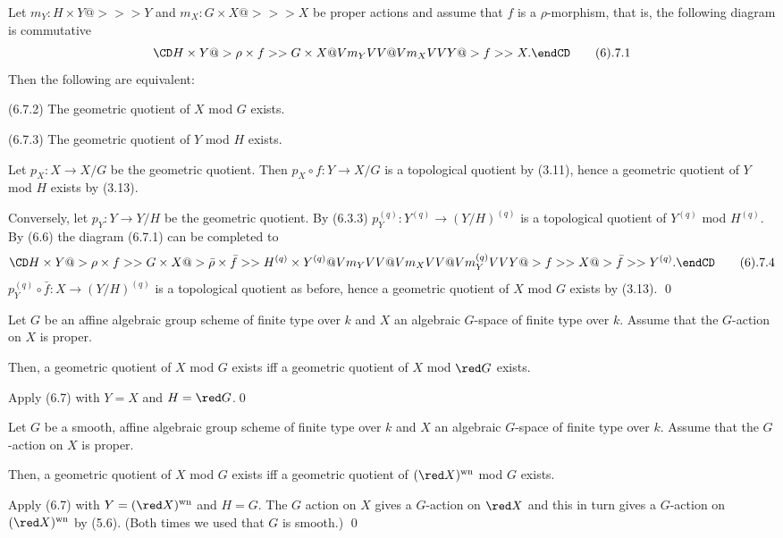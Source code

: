 Let $m_Y:H\times Y@>>> Y$ and $m_X:G\times X@>>> X$ be proper actions and
assume that $f$ is a $\rho$-morphism, that is, the following diagram is
commutative
$$
\CD
H\times Y@>{\rho\times f}>> G\times X\\
@Vm_YVV @Vm_XVV\\
Y@>f>> X.
\endCD\tag 6.7.1
$$
Then the following are equivalent:

(6.7.2) The geometric quotient of $X$ mod $G$ exists.

(6.7.3) The geometric quotient of $Y$ mod $H$ exists.
\endproclaim

\demop  Let
$p_X:X\to X/G$ be the geometric quotient. Then
$p_X\circ f:Y\to X/G$ is a topological quotient by (3.11), hence a
geometric quotient of $Y$ mod $H$ exists by (3.13).

Conversely,  let $p_Y:Y\to Y/H$ be the geometric quotient. By
(6.3.3)
$p_Y^{(q)}:Y^{(q)}\to (Y/H)^{(q)}$ is a topological quotient of $Y^{(q)}$ mod
$H^{(q)}$. By (6.6) the diagram (6.7.1) can be completed to
$$
\CD
H\times Y@>{\rho\times f}>> G\times X
@>{\bar{\rho}\times \bar f}>> H^{(q)}\times Y^{(q)}\\
@Vm_YVV @Vm_XVV @Vm_Y^{(q)}VV \\
Y@>f>> X@>\bar f>> Y^{(q)}.
\endCD\tag 6.7.4
$$
$p_Y^{(q)}\circ \bar f:X\to (Y/H)^{(q)}$ is a topological quotient as before,
hence a  geometric quotient of $X$ mod $G$ exists by (3.13). \qed
\enddemo


  Let $G$ be an affine algebraic group scheme of
finite type over $k$ and $X$ an algebraic $G$-space of finite type
over $k$. Assume that the $G$-action on $X$ is proper.

Then, a geometric quotient of $X$ mod $G$ exists iff
a geometric quotient of $X$ mod $\red G$ exists.
\endproclaim

\demop Apply (6.7) with $Y=X$ and $H=\red G$.\qed\enddemo








  Let $G$ be a smooth, affine  algebraic group
scheme of finite type over $k$ and $X$ an algebraic $G$-space of finite type
over $k$. Assume that the $G$-action on $X$ is proper.

Then, a geometric quotient of $X$ mod $G$ exists iff
a geometric quotient of $(\red X)^{\text{wn}}$ mod $G$ exists.
\endproclaim

\demop Apply (6.7) with $Y=(\red X)^{\text{wn}}$ and $H=G$.
The $G$ action on $X$ gives a $G$-action on $\red X$ and this in turn gives a
$G$-action on $(\red X)^{\text{wn}}$ by (5.6). (Both times we used that $G$ is
smooth.)
\qed\enddemo



